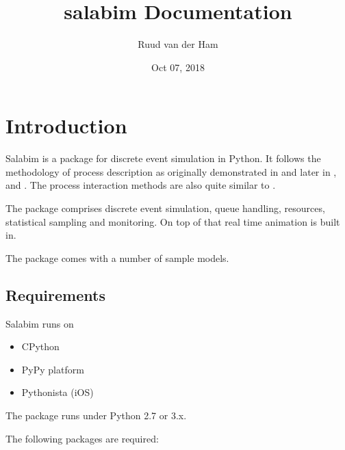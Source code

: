 \documentclass[letterpaper,10pt,english]{sphinxmanual}
\title{salabim Documentation}
\date{Oct 07, 2018}
\author{Ruud van der Ham}
\begin{document}
\maketitle
\sphinxtableofcontents
{}\label{\detokenize{index::doc}}



\chapter{Introduction}
\label{\detokenize{Introduction:introduction}}\label{\detokenize{Introduction::doc}}\label{\detokenize{Introduction:documentation-for-salabim}}
Salabim is a package for discrete event simulation in Python.
It follows the methodology of process description as originally demonstrated in 
and later in ,  and . 
The process interaction methods are also quite similar to .

The package comprises discrete event simulation, queue handling, resources, statistical sampling and monitoring.
On top of that real time animation is built in.

The package comes with a number of sample models.


\section{Requirements}
\label{\detokenize{Introduction:requirements}}
Salabim runs on
\begin{itemize}
\item {} 
CPython

\item {} 
PyPy platform

\item {} 
Pythonista (iOS)

\end{itemize}

The package runs under Python 2.7 or 3.x.

The following packages are required:
\end{document}
